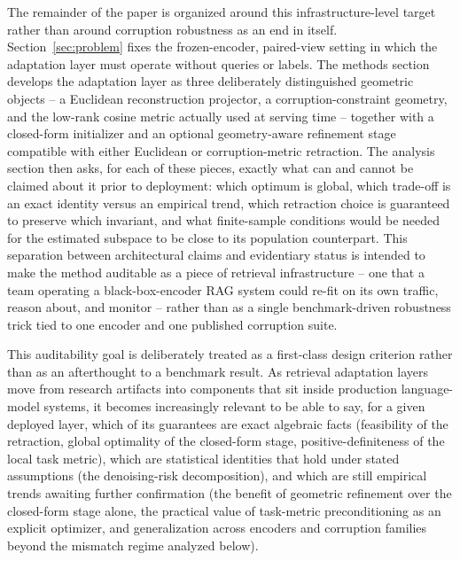 The remainder of the paper is organized around this infrastructure-level
target rather than around corruption robustness as an end in itself.
Section~\ref{sec:problem} fixes the frozen-encoder, paired-view setting in
which the adaptation layer must operate without queries or labels.
The methods section develops the adaptation layer as three deliberately
distinguished geometric objects -- a Euclidean reconstruction projector, a
corruption-constraint geometry, and the low-rank cosine metric actually
used at serving time -- together with a closed-form initializer and an
optional geometry-aware refinement stage compatible with either Euclidean
or corruption-metric retraction. The analysis section then asks, for each
of these pieces, exactly what can and cannot be claimed about it prior to
deployment: which optimum is global, which trade-off is an exact identity
versus an empirical trend, which retraction choice is guaranteed to
preserve which invariant, and what finite-sample conditions would be needed
for the estimated subspace to be close to its population counterpart. This
separation between architectural claims and evidentiary status is intended
to make the method auditable as a piece of retrieval infrastructure -- one
that a team operating a black-box-encoder RAG system could re-fit on its
own traffic, reason about, and monitor -- rather than as a single
benchmark-driven robustness trick tied to one encoder and one published
corruption suite.

This auditability goal is deliberately treated as a first-class design
criterion rather than as an afterthought to a benchmark result. As retrieval
adaptation layers move from research artifacts into components that sit
inside production language-model systems, it becomes increasingly relevant
to be able to say, for a given deployed layer, which of its guarantees are
exact algebraic facts (feasibility of the retraction, global optimality of
the closed-form stage, positive-definiteness of the local task metric),
which are statistical identities that hold under stated assumptions (the
denoising-risk decomposition), and which are still empirical trends awaiting
further confirmation (the benefit of geometric refinement over the
closed-form stage alone, the practical value of task-metric preconditioning
as an explicit optimizer, and generalization across encoders and corruption
families beyond the mismatch regime analyzed below).

